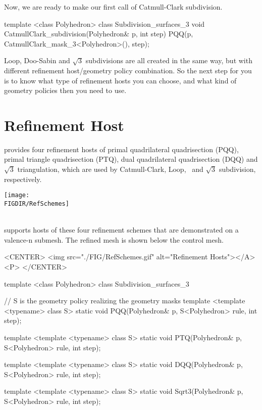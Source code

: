 Now, we are ready to make our first call of Catmull-Clark 
subdivision.

\begin{ccExampleCode}
template <class Polyhedron>
class Subdivision_surfaces_3 {
  void CatmullClark_subdivision(Polyhedron& p, int step) {
    PQQ(p, CatmullClark_mask_3<Polyhedron>(), step);
  }
}
\end{ccExampleCode}

Loop, Doo-Sabin and $\sqrt{3}$ subdivisions are all created in the
same way, but with different refinement host/geometry policy
combination. So the next step for you is to know what type of 
refinement hosts you can choose, and what kind of geometry policies
then you need to use.

\section{Refinement Host}
 provides four refinement hosts of primal 
quadrilateral quadrisection (PQQ), primal triangle 
quadrisection (PTQ), dual quadrilateral 
quadrisection (DQQ) and $\sqrt{3}$ triangulation, which 
are used by Catmull-Clark, Loop, \DS\ and $\sqrt{3}$ subdivision, 
respectively. 

\begin{ccTexOnly}
  \begin{center}
    \parbox{0.6\textwidth}{%
      \texttt{[image: \\FIGDIR/RefSchemes]}%
    }\\ \vspace{0.5cm}
     supports hosts of these four refinement 
    schemes that are demonstrated on a valence-n submesh.
    The refined mesh is shown below the control mesh.
  \end{center}
\end{ccTexOnly}

\begin{ccHtmlOnly}
  <CENTER>
     <img src="./FIG/RefSchemes.gif" alt="Refinement Hosts"></A><P>
  </CENTER>
\end{ccHtmlOnly}


\begin{ccExampleCode}
template <class Polyhedron>
class Subdivision_surfaces_3 {
  // S is the geometry policy realizing the geometry masks
  template <template <typename> class S>
  static void PQQ(Polyhedron& p, S<Polyhedron> rule, int step);

  template <template <typename> class S>
  static void PTQ(Polyhedron& p, S<Polyhedron> rule, int step);

  template <template <typename> class S>
  static void DQQ(Polyhedron& p, S<Polyhedron> rule, int step);

  template <template <typename> class S>
  static void Sqrt3(Polyhedron& p, S<Polyhedron> rule, int step);
}
\end{ccExampleCode}

